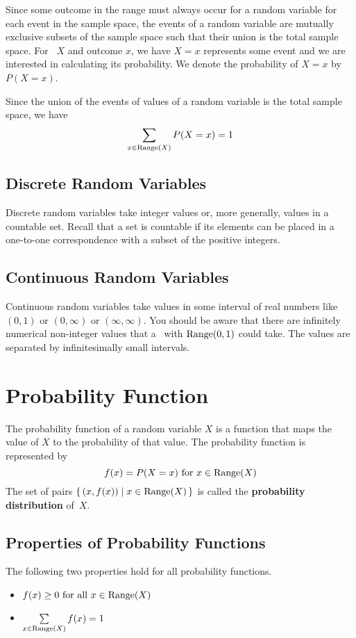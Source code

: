 Since some outcome in the range must always occur for a random variable for each event in the sample space, the events of a random variable are mutually exclusive subsets of the sample space such that their union is the total sample space. For \rv~$X$ and outcome $x$, we have $X = x$ represents some event and we are interested in calculating its probability. We denote the probability of $X = x$ by $P(X = x)$.
\begin{info}
Since the union of the events of values of a random variable is the total sample space, we have
\[
    \sum_{x \in \operatorname{Range}(X)} P(X=x) = 1
\]
\end{info}
\subsection*{Discrete Random Variables}
Discrete random variables take integer values or, more generally, values in a countable set. Recall that a set is countable if its elements can be placed in a one-to-one correspondence with a subset of the positive integers.
\subsection*{Continuous Random Variables}
Continuous random variables take values in some interval of real numbers like $(0,1)$ or $(0,\infty)$ or $(\infty,\infty)$. You should be aware that there are infinitely numerical non-integer values that a \rv~with $\operatorname{Range}(0,1)$ could take. The values are separated by infinitesimally small intervals.
\section{Probability Function}
The probability function of a random variable $X$ is a function that maps the value of $X$ to the probability of that value. The probability function is represented by 
\[
    f(x) = P(X = x)\text{ for } x\in\operatorname{Range}(X)
\]
The set of pairs $\{\, (x,f(x)) \mid x\in\operatorname{Range}(X) \,\}$ is called the \textbf{probability distribution} of~$X$.

\subsection*{Properties of Probability Functions}
The following two properties hold for all probability functions.
\begin{itemize}
    \item $f(x) \geq 0 \text{ for }\text{all } x\in\operatorname{Range}(X)$
    \item $\sum\limits_{x\in\operatorname{Range}(X)} f(x) = 1$
\end{itemize}
